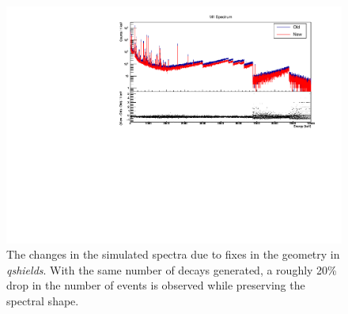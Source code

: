 \begin{figure}
    \centering
    \includegraphics[width=0.8\linewidth]{Figures/PTFESx_M1.pdf}
    \caption[The changes in the simulated spectra due to fixes in the geometry in \textit{qshields}]
    {The changes in the simulated spectra due to fixes in the geometry in \textit{qshields}.
    With the same number of decays generated, a roughly 20\% drop in the number of events is observed while preserving the spectral shape.}
    \label{fig:PTFESx_M1}
\end{figure}